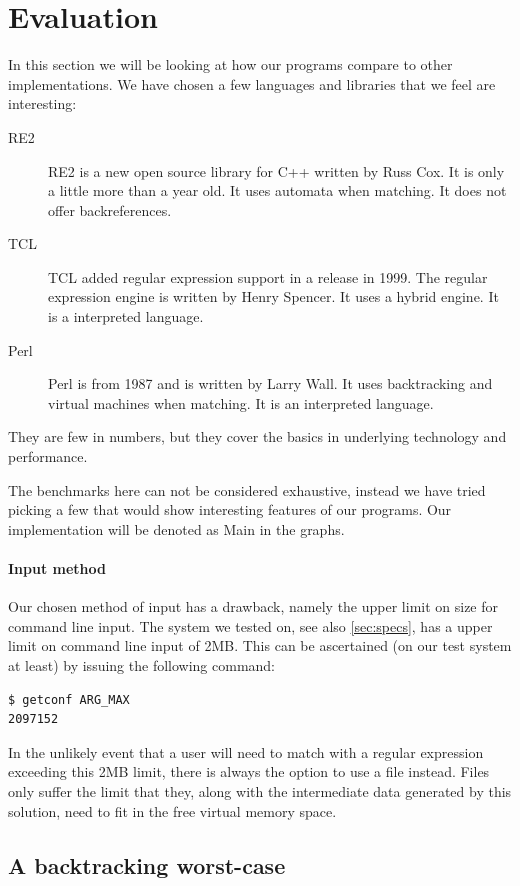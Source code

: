 \section{Evaluation}

In this section we will be looking at how our programs compare to
other implementations. We have chosen a few languages and libraries that we feel
are interesting:
\begin{description}
  \item[RE2] RE2 is a new open source library for C++ written by Russ
    Cox. It is only a little more than a year old. It uses automata
    when matching. It does not offer backreferences.
  \item[TCL]
    TCL added regular expression support in a release in 1999. The
    regular expression engine is written by Henry Spencer. It uses a
    hybrid engine. It is a interpreted language.
  \item[Perl] Perl is from 1987 and is written by Larry Wall. It uses
    backtracking and virtual machines when matching. It is an
    interpreted language. 
\end{description}
They are few in numbers, but they cover the basics in underlying
technology and performance. 

The benchmarks here can not be considered exhaustive, instead we have
tried picking a few that would show interesting features of our
programs. Our implementation will be denoted as Main in
the graphs.

\paragraph{Input method}
Our chosen method of input has a drawback, namely the upper limit on
size for command line input. The system we tested on, see also
\vref{sec:specs}, has a upper limit on command line input of 2MB. This
can be ascertained (on our test system at least) by issuing the
following command:
\begin{verbatim}
$ getconf ARG_MAX
2097152
\end{verbatim}
In the unlikely event that a user will need to match with a regular
expression exceeding this 2MB limit, there is always the option to use
a file instead. Files only suffer the limit that they, along with the intermediate data generated by this solution, need to fit in
the free virtual memory space.

\subsection{A backtracking worst-case}


